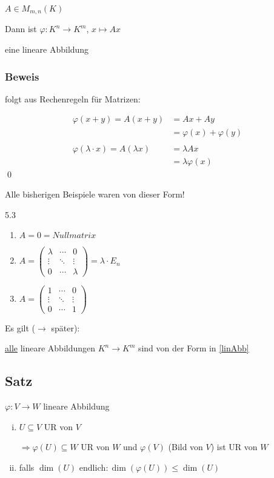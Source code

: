 $A \in M_{m,n}(K)$

Dann ist $\varphi: K^n \rightarrow K^m$, $x \mapsto Ax$

eine lineare Abbildung \bigskip

\subsubsection*{Beweis}

folgt aus Rechenregeln für Matrizen:

\begin{align*}
\varphi(x+y) = A(x+y) &= Ax + Ay\\
&= \varphi(x) + \varphi(y)\\
\\
\varphi(\lambda \cdot x) = A(\lambda x) &= \lambda A x\\
&= \lambda \varphi(x)
\end{align*}
\qed

Alle bisherigen Beispiele waren von dieser Form!

5.3
\begin{enumerate}
\item $A = 0 = Nullmatrix$

\item $A =
\begin{pmatrix}
\lambda & \cdots & 0\\
\vdots & \ddots & \vdots\\
0 & \cdots & \lambda
\end{pmatrix} =
\lambda \cdot E_n
$
\medskip

\item $A =
\begin{pmatrix}
1 & \cdots & 0\\
\vdots & \ddots & \vdots\\
0 & \cdots & 1
\end{pmatrix}
$ 
\end{enumerate}

Es gilt ($\rightarrow$ später):

\underline{alle} lineare Abbildungen $K^n \rightarrow K^m$ sind von der Form in \ref{linAbb}

\subsection{Satz}

$\varphi: V \rightarrow W$ lineare Abbildung

\begin{enumerate}[(i)]
	\item
	$U \subseteq V$ UR von $V$
	
	$\Rightarrow \varphi(U) \subseteq W$ UR von $W$ und $\varphi(V)$ (Bild von $V$) ist UR von $W$
	
	\item
	falls $\dim(U) {\text{ endlich}}: \dim(\varphi(U)) \leq \dim(U)$
\end{enumerate}

